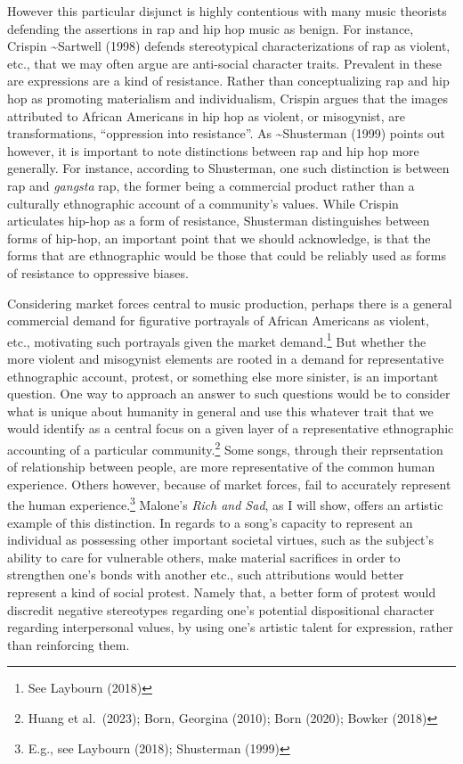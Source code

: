 \documentclass[
  letterpaper,
  DIV=11,
  numbers=noendperiod]{scrartcl}
\theoremstyle{remark}
\begin{document}
However this particular disjunct is highly contentious with many music
theorists defending the assertions in rap and hip hop music as benign.
For instance, Crispin \textasciitilde Sartwell (1998) defends
stereotypical characterizations of rap as violent, etc., that we may
often argue are anti-social character traits. Prevalent in these are
expressions are a kind of resistance. Rather than conceptualizing rap
and hip hop as promoting materialism and individualism, Crispin argues
that the images attributed to African Americans in hip hop as violent,
or misogynist, are transformations, ``oppression into resistance''. As
\textasciitilde Shusterman (1999) points out however, it is important to
note distinctions between rap and hip hop more generally. For instance,
according to Shusterman, one such distinction is between rap and
\emph{gangsta} rap, the former being a commercial product rather than a
culturally ethnographic account of a community's values. While Crispin
articulates hip-hop as a form of resistance, Shusterman distinguishes
between forms of hip-hop, an important point that we should acknowledge,
is that the forms that are ethnographic would be those that could be
reliably used as forms of resistance to oppressive biases.

Considering market forces central to music production, perhaps there is
a general commercial demand for figurative portrayals of African
Americans as violent, etc., motivating such portrayals given the market
demand.\footnote{See Laybourn (2018)} But whether the more violent and
misogynist elements are rooted in a demand for representative
ethnographic account, protest, or something else more sinister, is an
important question. One way to approach an answer to such questions
would be to consider what is unique about humanity in general and use
this whatever trait that we would identify as a central focus on a given
layer of a representative ethnographic accounting of a particular
community.\footnote{Huang et al.~(2023); Born, Georgina (2010); Born
  (2020); Bowker (2018)} Some songs, through their reprsentation of
relationship between people, are more representative of the common human
experience. Others however, because of market forces, fail to accurately
represent the human experience.\footnote{E.g., see Laybourn (2018);
  Shusterman (1999)} Malone's \emph{Rich and Sad}, as I will show,
offers an artistic example of this distinction. In regards to a song's
capacity to represent an individual as possessing other important
societal virtues, such as the subject's ability to care for vulnerable
others, make material sacrifices in order to strengthen one's bonds with
another etc., such attributions would better represent a kind of social
protest. Namely that, a better form of protest would discredit negative
stereotypes regarding one's potential dispositional character regarding
interpersonal values, by using one's artistic talent for expression,
rather than reinforcing them.
\end{document}
